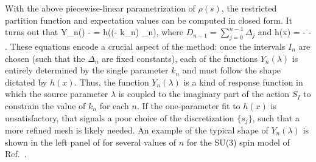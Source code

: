 \documentclass[../main.tex]{subfiles}
\begin{document}
With the above piecewise-linear parametrization of $\rho(s)$, the restricted partition function and expectation values can be
computed in closed form. It turns out that
%
\beq
Y_n(\lambda) \equiv {} -  = h((\lambda - k_n) \Delta_n),
\eeq
%
where $D_{n-1} = \sum_{j=0}^{n-1} \Delta_j$ and
%
\beq
h(x) =  -  - .
\eeq
%
These equations encode a crucial aspect of the method: once the intervals $I_n$ are chosen (such that the $\Delta_n$ are fixed constants),
each of the functions $Y_n(\lambda)$ is entirely determined by the single parameter $k_n$ and must follow the shape dictated by $h(x)$.
Thus, the function $Y_n(\lambda)$ is a kind of response function in which the source parameter $\lambda$ is coupled to the imaginary
part of the action $S_I$ to constrain the value of $k_n$ for each $n$. If the one-parameter fit to $h(x)$ is unsatisfactory, that signals
a poor choice of the discretization $\{ s_j \}$, such that a more refined mesh is likely needed.
An example of the typical shape of $Y_n(\lambda)$ is shown in the left panel of  for several values of $n$
for the SU(3) spin model of Ref.~\cite{GIULIANI2016627}.
\end{document}
